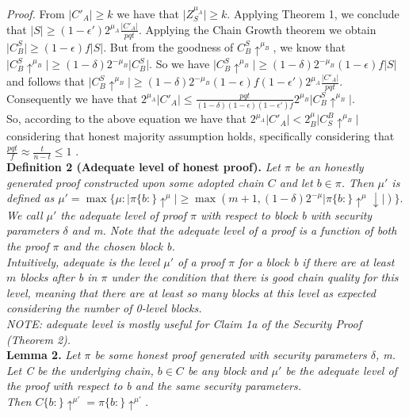 \documentclass[9pt,a4paper]{article}
\begin{document}
\textit{Proof.} From $\vert C'_A \vert \geq k$ we have that $\vert Z^{\mu_A}_S \vert \geq k$. Applying Theorem 1, we conclude that $\vert S \vert \geq (1-\epsilon')2^{\mu_A} \frac{\vert C'_A \vert}{pqt}$. Applying the Chain Growth theorem \cite{Backbone} we obtain $\vert C_{B}^S \vert \geq (1 - \epsilon)f \vert S \vert$. But from the goodness of $C_{B}^S \uparrow^{\mu_B}$, we know that $\vert C_{B}^S\uparrow^{\mu_B} \vert \geq (1 - \delta)2^{-\mu_B} \vert C_{B}^S \vert $. So we have $\vert C_{B}^S\uparrow^{\mu_B} \vert \geq (1 - \delta)2^{-\mu_B} (1 - \epsilon)f \vert S \vert $ and follows that $\vert C_{B}^S\uparrow^{\mu_B} \vert \geq (1 - \delta)2^{-\mu_B} (1 - \epsilon)f (1-\epsilon')2^{\mu_A} \frac{\vert C'_A \vert}{pqt} $. Consequently we have that $2^{\mu_A} \vert C'_A \vert \leq \frac{pqt}{(1- \delta)(1-\epsilon)(1-\epsilon')f} 2^{\mu_B} \vert C_{B}^S\uparrow^{\mu_B} \vert $.   \\

So, according to the above equation we have that $2^{\mu_A} \vert C'_A \vert <  2^\mu_B \vert    C^{B}_{S}\uparrow^{\mu_B}\vert $ considering that honest  majority assumption holds, specifically considering that $ \frac{pqt}{f} \approx \frac{t}{n-t} \leq 1 $ .\\

\textbf{Definition 2 (Adequate level of honest proof).} \textit{Let $\pi$ be an honestly generated proof constructed upon some adopted chain $C$ and let $b \in \pi $. Then $\mu'$ is defined as $\mu' = \max \{ \mu: \vert \pi\{b:\}\uparrow^{\mu} \vert \geq \max( m+1, (1-\delta)2^{-\mu} \vert \pi\{b:\}\uparrow^{\mu}\downarrow \vert )   \}$}.
\textit{We call $\mu'$ the adequate level of proof $\pi$ with respect to block b with security parameters $\delta$ and m. Note that the adequate level of a proof is a function of both the proof $\pi$ and the chosen block b.}\\

\textit{Intuitively, adequate is the level $\mu'$ of a proof $\pi$ for a block b if there are at least $m$ blocks after b in $\pi$ under the condition that there is good chain quality for this level, meaning that there are at least so many blocks at this level as expected considering the number of 0-level blocks.\\ 
NOTE: adequate level is mostly useful for Claim 1a of the Security Proof (Theorem 2).}\\

\textbf{Lemma 2.} \textit{Let $\pi$ be some honest proof generated with security parameters $\delta$, m. Let C be the underlying chain, $b \in C$ be any block and $\mu'$ be the adequate level of the proof with respect to b and the same security parameters.\\Then $C\{b:\}\uparrow^{\mu'} = \pi\{b:\}\uparrow^{\mu'}$.}\\
\end{document}
